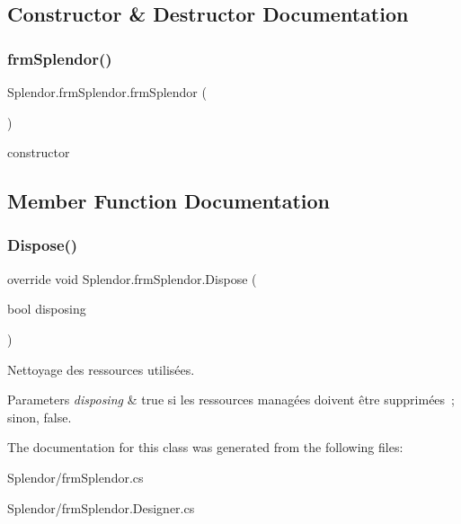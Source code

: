 \subsection{Constructor \& Destructor Documentation}
\mbox{\label{class_splendor_1_1frm_splendor_ad9c938893d23192acb1996053e3ea87b}} 
\subsubsection{\texorpdfstring{frm\+Splendor()}{frmSplendor()}}
{\footnotesize\ttfamily Splendor.\+frm\+Splendor.\+frm\+Splendor (\begin{DoxyParamCaption}{ }\end{DoxyParamCaption})}



constructor 



\subsection{Member Function Documentation}
\mbox{\label{class_splendor_1_1frm_splendor_a749f4f1d67c78e74aa1a55aa6fdd754b}} 
\subsubsection{\texorpdfstring{Dispose()}{Dispose()}}
{\footnotesize\ttfamily override void Splendor.\+frm\+Splendor.\+Dispose (\begin{DoxyParamCaption}\item[{bool}]{disposing }\end{DoxyParamCaption})\hspace{0.3cm}{\ttfamily [protected]}}



Nettoyage des ressources utilisées. 


\begin{DoxyParams}{Parameters}
{\em disposing} & true si les ressources managées doivent être supprimées ; sinon, false.\\
\hline
\end{DoxyParams}


The documentation for this class was generated from the following files\+:\begin{DoxyCompactItemize}
\item 
Splendor/frm\+Splendor.\+cs\item 
Splendor/frm\+Splendor.\+Designer.\+cs\end{DoxyCompactItemize}
